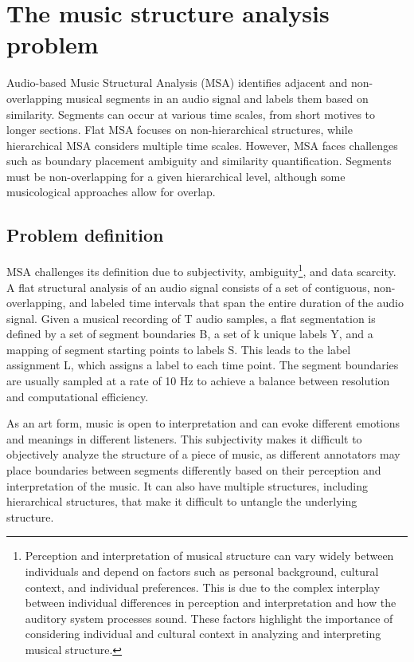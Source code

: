 \section{The music structure analysis problem}

Audio-based Music Structural Analysis (MSA) identifies adjacent and non-overlapping musical segments in an audio signal and labels them based on similarity. Segments can occur at various time scales, from short motives to longer sections. Flat MSA focuses on non-hierarchical structures, while hierarchical MSA considers multiple time scales. However, MSA faces challenges such as boundary placement ambiguity and similarity quantification. Segments must be non-overlapping for a given hierarchical level, although some musicological approaches allow for overlap.

\subsection{Problem definition}

MSA challenges its definition due to subjectivity, ambiguity\footnote{Perception and interpretation of musical structure can vary widely between individuals and depend on factors such as personal background, cultural context, and individual preferences. This is due to the complex interplay between individual differences in perception and interpretation and how the auditory system processes sound. These factors highlight the importance of considering individual and cultural context in analyzing and interpreting musical structure.}, and data scarcity. A flat structural analysis of an audio signal consists of a set of contiguous, non-overlapping, and labeled time intervals that span the entire duration of the audio signal. Given a musical recording of T audio samples, a flat segmentation is defined by a set of segment boundaries B, a set of k unique labels Y, and a mapping of segment starting points to labels S. This leads to the label assignment L, which assigns a label to each time point. The segment boundaries are usually sampled at a rate of 10 Hz to achieve a balance between resolution and computational efficiency.

As an art form, music is open to interpretation and can evoke different emotions and meanings in different listeners. This subjectivity makes it difficult to objectively analyze the structure of a piece of music, as different annotators may place boundaries between segments differently based on their perception and interpretation of the music. It can also have multiple structures, including hierarchical structures, that make it difficult to untangle the underlying structure.

